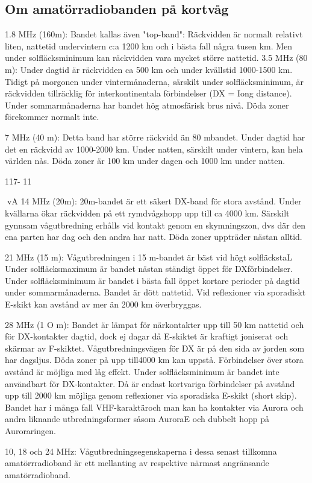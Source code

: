 \subsection{Om amatörradiobanden på kortvåg}

1.8 MHz (160m):
Bandet kallas även "top-band": Räckvidden
är normalt relativt liten, nattetid undervintern
c:a 1200 km och i bästa fall några tusen km.
Men under solfläcksminimum kan räckvidden vara mycket större nattetid.
3.5 MHz (80 m):
Under dagtid är räckvidden ca 500 km och
under kvällstid 1000-1500 km. Tidigt på
morgonen under vintermånaderna, särskilt
under solfläcksminimum, är räckvidden tillräcklig för interkontinentala förbindelser (DX
= Iong distance). Under sommarmånaderna
har bandet hög atmosfärisk brus nivå. Döda
zoner förekommer normalt inte.

7 MHz (40 m):
Detta band har större räckvidd än 80 mbandet. Under dagtid har det en räckvidd av
1000-2000 km. Under natten, särskilt under
vintern, kan hela världen nås. Döda zoner är
100 km under dagen och 1000 km under
natten.

117- 11

vA
14 MHz (20m):
20m-bandet är ett säkert DX-band för stora
avstånd. Under kvällarna ökar räckvidden
på ett rymdvågshopp upp till ca 4000 km.
Särskilt gynnsam vågutbredning erhålls vid
kontakt genom en skymningszon, dvs där
den ena parten har dag och den andra har
natt. Döda zoner uppträder nästan alltid.

21 MHz (15 m):
Vågutbredningen i 15 m-bandet är bäst vid
högt solfläckstaL Under solfläcksmaximum
är bandet nästan ständigt öppet för DXförbindelser.
Under solfläcksminimum är bandet i bästa
fall öppet kortare perioder på dagtid under
sommarmånaderna.
Bandet är dött nattetid. Vid reflexioner via
sporadiskt E-skikt kan avstånd av mer än
2000 km överbryggas.

28 MHz (1 O m):
Bandet är lämpat för närkontakter upp till 50
km nattetid och för DX-kontakter dagtid,
dock ej dagar då E-skiktet är kraftigt joniserat
och skärmar av F-skiktet. Vågutbredningsvägen för DX är på den sida av jorden som
har dagsljus. Döda zoner på upp till4000 km
kan uppstå. Förbindelser över stora avstånd
är möjliga med låg effekt.
Under solfläcksminimum är bandet inte
användbart för DX-kontakter. Då är endast
kortvariga förbindelser på avstånd upp till
2000 km möjliga genom reflexioner via sporadiska E-skikt (short skip).
Bandet har i många fall VHF-karaktäroch
man kan ha kontakter via Aurora och andra
liknande utbredningsformer såsom AuroraE och dubbelt hopp på Auroraringen.

10, 18 och 24 MHz:
Vågutbredningsegenskaperna i dessa senast tillkomna amatörrradioband är ett mellanting av respektive närmast angränsande
amatörradioband.

